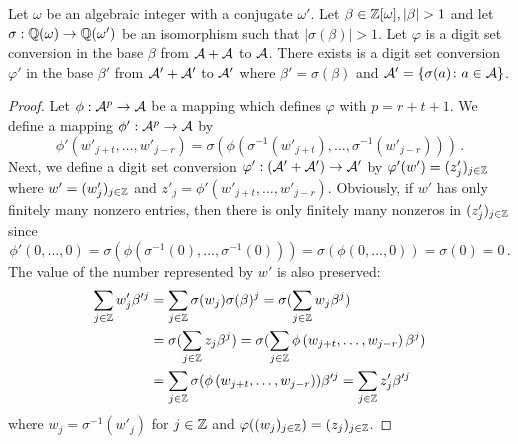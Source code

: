 \begin{lem}
\label{lem:parAddAlgForConjugate}
Let $\omega$ be an algebraic integer with a conjugate $\omega'$. Let $\beta\in\Zomega, |\beta|>1$ and let $\sigma:\mathbb{Q}(\omega)\rightarrow \mathbb{Q}(\omega')$ be an isomorphism such that $|\sigma(\beta)|>1$. Let $\varphi$ is a digit set conversion  in the base $\beta$ from $\mathcal{A}+\mathcal{A}$ to $\mathcal{A}$. There exists  is a digit set conversion $\varphi'$ in the base $\beta'$ from $\mathcal{A}'+\mathcal{A}'$ to $\mathcal{A}'$ where $\beta'=\sigma(\beta)$ and $\mathcal{A}'=\{\sigma(a) \colon a\in\mathcal{A}\}$.
\end{lem}
\begin{proof}
Let $\phi:\mathcal{A}^p\rightarrow\mathcal{A}$ be a mapping which defines $\varphi$ with $p=r+t+1$. We define a mapping $\phi':\mathcal{A}^p\rightarrow \mathcal{A}$ by 
$$
\phi'(w'_{j+t}, \dots, w'_{j-r})=\sigma\left(\phi\left(\sigma^{-1}(w'_{j+t}), \dots, \sigma^{-1}(w'_{j-r})\right)\right)\,.
$$
Next, we define a digit set conversion  $\varphi':(\mathcal{A}'+\mathcal{A}')\rightarrow\mathcal{A}'$ by $\varphi'(w')=(z'_j)_{j\in\mathbb{Z}}$ where $w'=(w'_j)_{j\in\mathbb{Z}}$ and $z'_j=\phi'(w'_{j+t}, \dots, w'_{j-r})$. Obviously, if $w'$ has only finitely many nonzero entries, then there is only finitely many nonzeros in $(z'_j)_{j\in\mathbb{Z}}$   since
$$
\phi'(0, \dots, 0)=\sigma\left(\phi\left(\sigma^{-1}(0), \dots, \sigma^{-1}(0)\right)\right)=\sigma\left(\phi\left(0, \dots, 0\right)\right)=\sigma\left(0\right)=0\,.
$$
The value of the number represented by $w'$ is also preserved:
\begin{align*}
\sum_{j\in\mathbb{Z}}w'_j \beta'^j&=\sum_{j\in\mathbb{Z}}\sigma(w_j) \sigma(\beta)^j=\sigma(\sum_{j\in\mathbb{Z}}w_j\beta^j)\\
&=\sigma(\sum_{j\in\mathbb{Z}}z_j\beta^j)=\sigma(\sum_{j\in\mathbb{Z}}\phi\left(w_{j+t}, \dots,w_{j-r}\right)\beta^j)\\
&=\sum_{j\in\mathbb{Z}}\sigma(\phi\left(w_{j+t}, \dots,w_{j-r}\right))\beta'^j=\sum_{j\in\mathbb{Z}}z'_j \beta'^j
\end{align*}
where $w_j=\sigma^{-1}(w'_j)$ for $j\in\mathbb{Z}$ and $\varphi((w_j)_{j\in\mathbb{Z}})=(z_j)_{j\in\mathbb{Z}}$.
\end{proof}


